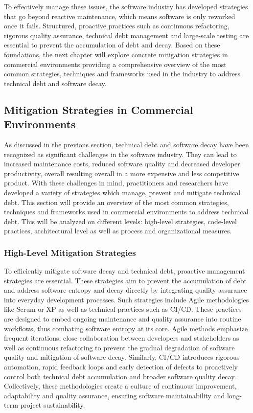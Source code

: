 To effectively manage these issues, the software industry has developed strategies that go beyond reactive maintenance, which means software is only reworked once it fails. Structured, proactive practices such as continuous refactoring, rigorous quality assurance, technical debt management and large-scale testing are essential to prevent the accumulation of debt and decay.
Based on these foundations, the next chapter will explore concrete mitigation strategies in commercial environments providing a comprehensive overview of the most common strategies, techniques and frameworks used in the industry to address technical debt and software decay.

\subsection{Mitigation Strategies in Commercial Environments}
As discussed in the previous section, technical debt and software decay have been recognized as significant challenges in the software industry. They can lead to 
increased maintenance costs, reduced software quality and decreased developer productivity, overall resulting overall in a more expensive and less competitive product.
With these challenges in mind, practitioners and researchers have developed a variety of strategies which manage, prevent and mitigate technical debt.
This section will provide an overview of the most common strategies, techniques and frameworks used in commercial environments to address technical debt.
This will be analyzed on different levels: high-level strategies, code-level practices, architectural level as well as process and organizational measures.

\subsubsection{High-Level Mitigation Strategies}
To efficiently mitigate software decay and technical debt, proactive management strategies are essential. These strategies aim to prevent the accumulation of 
debt and address software entropy and decay directly by integrating quality assurance into everyday development processes.
Such strategies include Agile methodologies like Scrum or \ac{XP} as well as technical practices
such as \ac{CI/CD}. These practices are designed to embed ongoing maintenance and quality assurance into routine workflows, thus combating software entropy at its core.
Agile methods emphasize frequent iterations, close collaboration between developers and stakeholders as well as continuous refactoring to prevent the
gradual degradation of software quality and mitigation of software decay.
Similarly, \ac{CI/CD} introduces rigorous automation, rapid feedback loops and early detection of defects to proactively control both technical debt accumulation
and broader software quality decay. Collectively, these methodologies create a culture of continuous improvement, adaptability and quality assurance, 
ensuring software maintainability and long-term project sustainability.

